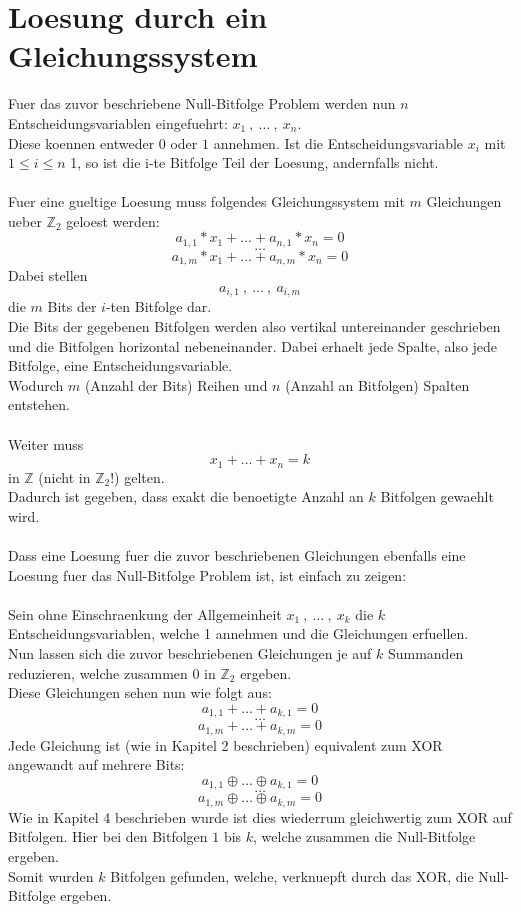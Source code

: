 \documentclass[a4paper,10pt,ngerman]{scrartcl}
\begin{document}
\section{Loesung durch ein Gleichungssystem}
Fuer das zuvor beschriebene Null-Bitfolge Problem werden nun \(n\) Entscheidungsvariablen eingefuehrt: \(x_1 \ , \ \dots \ , \ x_n\).\\
Diese koennen entweder \(0\) oder \(1\) annehmen. Ist die Entscheidungsvariable \(x_i\) mit \(1 \leq i \leq n\) 1, so ist die i-te Bitfolge Teil der Loesung, andernfalls nicht.\\\\
Fuer eine gueltige Loesung muss folgendes Gleichungssystem mit \(m\) Gleichungen ueber \(\mathbb{Z}_{2}\) geloest werden:\\
\[a_{1, 1} * x_1 + \dots + a_{n, 1} * x_n = 0\]
\[\dots\]
\[a_{1, m} * x_1 + \dots + a_{n, m}  * x_n = 0\]
Dabei stellen 
\[a_{i, 1} \ , \ \dots \ , \ a_{i, m}\]
die \(m\) Bits der $i$-ten Bitfolge dar.\\
Die Bits der gegebenen Bitfolgen werden also vertikal untereinander geschrieben und die Bitfolgen horizontal nebeneinander. Dabei erhaelt jede Spalte, also jede Bitfolge, eine Entscheidungsvariable.\\
Wodurch \(m\) (Anzahl der Bits) Reihen und \(n\) (Anzahl an Bitfolgen) Spalten entstehen.\\\\
Weiter muss 
\[x_1 + \dots + x_n = k\]
in \(\mathbb{Z}\) (nicht in \(\mathbb{Z}_{2}\)!) gelten.\\
Dadurch ist gegeben, dass exakt die benoetigte Anzahl an \(k\) Bitfolgen gewaehlt wird.\\\\
Dass eine Loesung fuer die zuvor beschriebenen Gleichungen ebenfalls eine Loesung fuer das Null-Bitfolge Problem ist, ist einfach zu zeigen:\\\\
Sein ohne Einschraenkung der Allgemeinheit \(x_1 \ , \ \dots \ , \ x_{k}\) die \(k\) Entscheidungsvariablen, welche 1 annehmen und die Gleichungen erfuellen.\\
Nun lassen sich die zuvor beschriebenen Gleichungen je auf \(k\) Summanden reduzieren, welche zusammen 0 in \(\mathbb{Z}_{2}\) ergeben.\\
Diese Gleichungen sehen nun wie folgt aus:
\[a_{1, 1} + \dots + a_{k, 1} = 0\]
\[\dots\]
\[a_{1, m} + \dots + a_{k, m} = 0\]
Jede Gleichung ist (wie in Kapitel 2 beschrieben) equivalent zum XOR angewandt auf mehrere Bits:
\[a_{1, 1} \oplus \dots \oplus a_{k, 1} = 0\]
\[\dots\]
\[a_{1, m} \oplus \dots \oplus a_{k, m} = 0\]
Wie in Kapitel 4 beschrieben wurde ist dies wiederrum gleichwertig zum XOR auf Bitfolgen. Hier bei den Bitfolgen \(1\) bis \(k\), welche zusammen die Null-Bitfolge ergeben.\\
Somit wurden \(k\) Bitfolgen gefunden, welche, verknuepft durch das XOR, die Null-Bitfolge ergeben.
\end{document}
